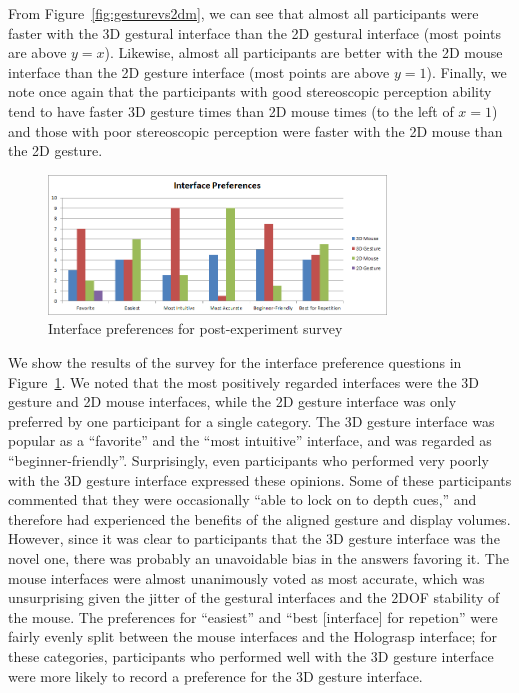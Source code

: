 \documentclass[pageno]{jpaper}
\begin{document}
From Figure~\ref{fig:gesturevs2dm}, we can see that almost all participants were
faster with the 3D gestural interface than the 2D gestural interface (most
points are above $y = x$). Likewise, almost all participants are better with the
2D mouse interface than the 2D gesture interface (most points are above $y=1$).
Finally, we note once again that the participants with good stereoscopic
perception ability tend to have faster 3D gesture times than 2D mouse times (to
the left of $x=1$) and those with poor stereoscopic perception were faster with
the 2D mouse than the 2D gesture.

\begin{figure}[h]
\centering
\includegraphics[width=0.8\textwidth]{figures/survey.png}
\caption{Interface preferences for post-experiment survey}
\label{fig:survey}
\end{figure}

We show the results of the survey for the interface preference questions in
Figure~\ref{fig:survey}. We noted that the most positively regarded interfaces were the 3D gesture and 2D mouse interfaces, while the
2D gesture interface was only preferred by one participant for a single category. The 3D gesture interface was popular as a ``favorite'' and the ``most intuitive''
interface, and was regarded as ``beginner-friendly''. Surprisingly, even participants who performed very poorly with the 3D gesture interface expressed these opinions.
Some of these participants commented that they were occasionally ``able to lock on to depth cues,'' and therefore had experienced the benefits of the aligned gesture
and display volumes. However, since it was clear to participants that the 3D gesture interface was the novel one, there was probably an unavoidable bias in the answers favoring it.
The mouse interfaces were almost unanimously voted as most accurate, which was unsurprising given the jitter of the gestural interfaces and the
2DOF stability of the mouse. The preferences for ``easiest'' and ``best [interface] for repetion'' were fairly evenly split between the mouse interfaces and the Holograsp
interface; for these categories, participants who performed well with the 3D gesture interface were more likely to record a preference for the 3D gesture interface.
\end{document}
